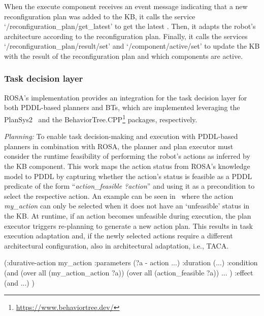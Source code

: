 When the execute component receives an event message indicating that a new reconfiguration plan was added to the KB, it calls the service `/reconfiguration\_plan/get\_latest' to get the latest . Then, it adapts the robot's architecture according to the reconfiguration plan. Finally, it calls the services `/reconfiguration\_plan/result/set' and `/component/active/set' to update the KB with the result of the reconfiguration plan and which components are active.

\subsubsection{Task decision layer}
ROSA's implementation provides an integration for the task decision layer for both PDDL-based planners and BTs, which are implemented leveraging the PlanSys2~\citep{plansys2} and the BehaviorTree.CPP\footnote{\url{https://www.behaviortree.dev/}} packages, respectively.


\emph{Planning:}
To enable task decision-making and execution with PDDL-based planners in combination with ROSA, the planner and plan executor must consider the runtime feasibility of performing the robot's actions as inferred by the KB component.
This work maps the action status from ROSA's knowledge model to PDDL by
capturing whether the action's status is feasible as a PDDL predicate of the form ``\emph{action\_feasible ?action}'' and using it as a precondition to select the respective action. An example can be seen in~ where the action \emph{my\_action} can only be selected when it does not have an `unfeasible' status in the KB\@. %
At runtime, if an action becomes unfeasible during execution, the plan executor triggers re-planning to generate a new action plan. This results in task execution adaptation and, if the newly selected actions require a different architectural configuration, also in architectural adaptation, i.e., TACA\@.

\par\medskip\noindent\begin{minipage}{\linewidth}
\captionsetup{type=listing}
\begin{Piton}[language=PDDL, line-numbers={skip-empty-lines=false, label-empty-lines=false}]
 (:durative-action my_action
   :parameters (?a - action ...)
   :duration (...)
   :condition (and
     (over all (my_action_action ?a))
     (over all (action_feasible ?a))
     ...
   )
   :effect (and ...)
 )
\end{Piton}
\caption{PDDL formulation example for ROSA}%
\label{lst:task_interface_pddl}
\end{minipage}\par\medskip

